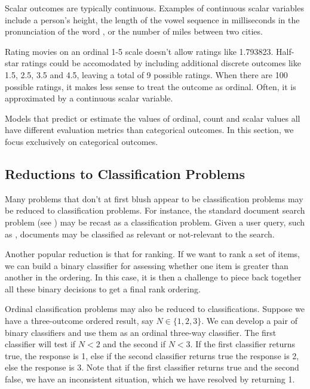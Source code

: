 Scalar outcomes are typically continuous.  Examples of continuous
scalar variables include a person's height, the length of the vowel
sequence in milliseconds in the pronunciation of the word
, or the number of miles between two cities.  

Rating movies on an ordinal 1-5 scale doesn't allow ratings like
1.793823.  Half-star ratings could be accomodated by including
additional discrete outcomes like 1.5, 2.5, 3.5 and 4.5, leaving a
total of 9 possible ratings.  When there are 100 possible ratings, it
makes less sense to treat the outcome as ordinal.  Often, it is
approximated by a continuous scalar variable.

Models that predict or estimate the values of ordinal, count and
scalar values all have different evaluation metrics than categorical
outcomes.  In this section, we focus exclusively on categorical
outcomes.


\subsection{Reductions to Classification Problems}

Many problems that don't at first blush appear to be classification
problems may be reduced to classification problems.  For instance, the
standard document search problem (see ) may be recast
as a classification problem.  Given a user query, such as
, documents may be classified as
relevant or not-relevant to the search.  

Another popular reduction is that for ranking.  If we want to rank a
set of items, we can build a binary classifier for assessing whether
one item is greater than another in the ordering.  In this case, it is
then a challenge to piece back together all these binary decisions to
get a final rank ordering.

Ordinal classification problems may also be reduced to
classifications.  Suppose we have a three-outcome ordered result, say
$N \in \{ 1, 2, 3 \}$.  We can develop a pair of binary classifiers
and use them as an ordinal three-way classifier.  The first classifier
will test if $N < 2$ and the second if $N < 3$.  If the first
classifier returns true, the response is 1, else if the second
classifier returns true the response is 2, else the response is 3.
Note that if the first classifier returns true and the second false,
we have an inconsistent situation, which we have resolved by returning
1.

